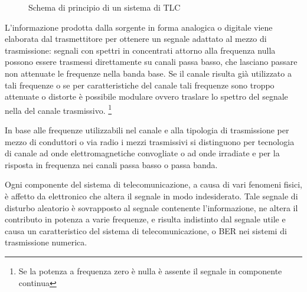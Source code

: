 \begin{figure}[!ht]
\centering
{}
\caption{Schema di principio di un sistema di TLC}\label{fig:schema_sistema_telecomunicazioni}
\end{figure}

L'informazione prodotta dalla sorgente in forma analogica o digitale viene elaborata dal trasmettitore per ottenere un segnale adattato al mezzo di trasmissione: segnali con spettri in  concentrati attorno alla frequenza nulla possono essere trasmessi direttamente su canali passa basso, che lasciano passare non attenuate le frequenze nella banda base. Se il canale risulta già utilizzato a tali frequenze o se per caratteristiche del canale tali frequenze sono troppo attenuate o distorte è possibile modulare ovvero traslare lo spettro del segnale nella  del canale trasmissivo. \footnote{Se la potenza a frequenza zero è nulla è assente il segnale in componente continua}

In base alle frequenze utilizzabili nel canale e alla tipologia di trasmissione per mezzo di conduttori o via radio i mezzi trasmissivi si distinguono per tecnologia di canale ad onde elettromagnetiche convogliate o ad onde irradiate e per la risposta in frequenza nei canali passa basso o passa banda.

Ogni componente del sistema di telecomunicazione, a causa di vari fenomeni fisici, è affetto da  elettronico che altera il segnale in modo indesiderato. Tale segnale di disturbo aleatorio è sovrapposto al segnale contenente l'informazione, ne altera il contributo in potenza a varie frequenze, e risulta indistinto dal segnale utile e causa un  caratteristico del sistema di telecomunicazione, o \ac{BER} nei sistemi di trasmissione numerica.

